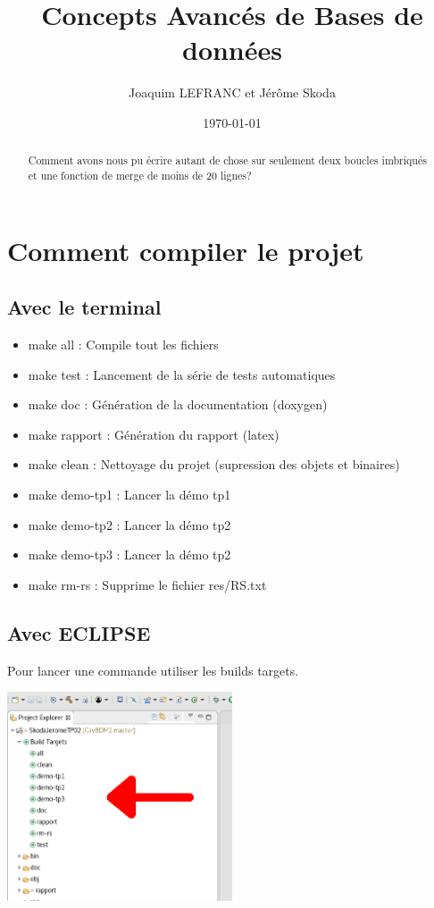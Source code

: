 \documentclass[a4paper]{article}
\title{Concepts Avancés de Bases de données}
\author{Joaquim LEFRANC et Jérôme Skoda}
\date{\today}
\begin{document}
\maketitle

\begin{abstract}
Comment avons nous pu écrire autant de chose sur seulement deux boucles imbriqués et une fonction de merge de moins de 20 lignes?
\end{abstract}

\section{Comment compiler le projet}

\subsection{Avec le terminal}

\begin{itemize}
	\item make all : Compile tout les fichiers
	\item make test : Lancement de la série de tests automatiques
	\item make doc  : Génération de la documentation (doxygen)
	\item make rapport : Génération du rapport (latex)
	\item make clean : Nettoyage du projet (supression des objets et binaires)
	\item make demo-tp1 : Lancer la démo tp1
	\item make demo-tp2 : Lancer la démo tp2
	\item make demo-tp3 : Lancer la démo tp2
	\item make rm-rs : Supprime le fichier res/RS.txt
\end{itemize}

\subsection{Avec ECLIPSE}

Pour lancer une commande utiliser les builds targets.

\includegraphics[width=0.5\textwidth]{builds-target.png}
\end{document}

